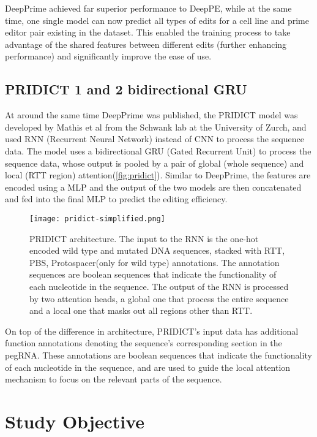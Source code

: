 DeepPrime achieved far superior performance to DeepPE, while at the same time, one single model can now predict all types of edits for a cell line and prime editor pair existing in the dataset. This enabled the training process to take advantage of the shared features between different edits (further enhancing performance) and significantly improve the ease of use.

\subsection{PRIDICT 1 and 2 bidirectional GRU}

At around the same time DeepPrime was published, the PRIDICT model was developed by Mathis et al from the Schwank lab at the University of Zurch, and used RNN (Recurrent Neural Network) instead of CNN to process the sequence data\cite{mathisPredictingPrimeEditing2023}. The model uses a bidirectional GRU (Gated Recurrent Unit) to process the sequence data, whose output is pooled by a pair of global (whole sequence) and local (RTT region) attention(\autoref{fig:pridict}). Similar to DeepPrime, the features are encoded using a MLP and the output of the two models are then concatenated and fed into the final MLP to predict the editing efficiency.

\begin{figure}
    \centering
    \texttt{[image: pridict-simplified.png]}
    \caption[PRIDICT architecture]{PRIDICT architecture. The input to the RNN is the one-hot encoded wild type and mutated DNA sequences, stacked with RTT, PBS, Protospacer(only for wild type) annotations. The annotation sequences are boolean sequences that indicate the functionality of each nucleotide in the sequence. The output of the RNN is processed by two attention heads, a global one that process the entire sequence and a local one that masks out all regions other than RTT. }
    \label{fig:pridict}
\end{figure}

On top of the difference in architecture, PRIDICT's input data has additional function annotations denoting the sequence's corresponding section in the pegRNA. These annotations are boolean sequences that indicate the functionality of each nucleotide in the sequence, and are used to guide the local attention mechanism to focus on the relevant parts of the sequence. 

\section{Study Objective}

